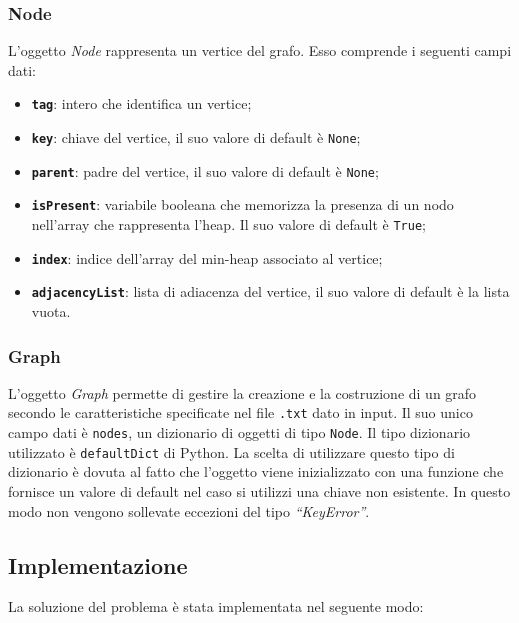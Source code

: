 	\subsubsection{Node}
	L'oggetto \textit{Node} rappresenta un vertice del grafo. 
	Esso comprende i seguenti campi dati:
	\begin{itemize}
		\item \texttt{\textbf{tag}}: intero che identifica un vertice;
		\item \texttt{\textbf{key}}: chiave del vertice, il suo valore di default è \texttt{None};
		\item \texttt{\textbf{parent}}: padre del vertice, il suo valore di default è \texttt{None};
		\item \texttt{\textbf{isPresent}}: variabile booleana che memorizza la presenza di un nodo nell'array che rappresenta l'heap. Il suo valore di default è \texttt{True};
		\item \texttt{\textbf{index}}: indice dell'array del min-heap associato al vertice; 
		\item \texttt{\textbf{adjacencyList}}: lista di adiacenza del vertice, il suo valore di default è la lista vuota.
	\end{itemize}
	
	\subsubsection{Graph}
		L'oggetto \textit{Graph} permette di gestire la creazione e la costruzione di un grafo secondo le caratteristiche specificate nel file \texttt{.txt} dato in input. 
		Il suo unico campo dati è \texttt{nodes}, un dizionario di oggetti di tipo \texttt{Node}. 
		Il tipo dizionario utilizzato è \texttt{defaultDict} di Python. 
		La scelta di utilizzare questo tipo di dizionario è dovuta al fatto che l'oggetto viene inizializzato con una funzione che fornisce un valore di default nel caso si utilizzi una chiave non esistente. 
		In questo modo non vengono sollevate eccezioni del tipo \textit{``KeyError''}.

\subsection{Implementazione}

	La soluzione del problema è stata implementata nel seguente modo:
	
